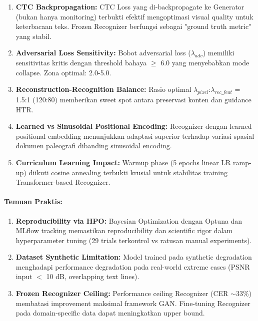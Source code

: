 \documentclass[12pt,a4paper]{article}
\begin{document}
\begin{enumerate}[label=\arabic*., leftmargin=0.5cm]
    \item \textbf{CTC Backpropagation:} CTC Loss yang di-backpropagate ke Generator (bukan hanya monitoring) terbukti efektif mengoptimasi visual quality untuk keterbacaan teks. Frozen Recognizer berfungsi sebagai "ground truth metric" yang stabil.
    
    \item \textbf{Adversarial Loss Sensitivity:} Bobot adversarial loss ($\lambda_{adv}$) memiliki sensitivitas kritis dengan threshold bahaya $\geq$ 6.0 yang menyebabkan mode collapse. Zona optimal: 2.0-5.0.
    
    \item \textbf{Reconstruction-Recognition Balance:} Rasio optimal $\lambda_{pixel}$:$\lambda_{rec\_feat}$ = 1.5:1 (120:80) memberikan sweet spot antara preservasi konten dan guidance HTR.
    
    \item \textbf{Learned vs Sinusoidal Positional Encoding:} Recognizer dengan learned positional embedding menunjukkan adaptasi superior terhadap variasi spasial dokumen paleografi dibanding sinusoidal encoding.
    
    \item \textbf{Curriculum Learning Impact:} Warmup phase (5 epochs linear LR ramp-up) diikuti cosine annealing terbukti krusial untuk stabilitas training Transformer-based Recognizer.
\end{enumerate}

\paragraph{Temuan Praktis:}

\begin{enumerate}[label=\arabic*., leftmargin=0.5cm]
    \item \textbf{Reproducibility via HPO:} Bayesian Optimization dengan Optuna dan MLflow tracking memastikan reproducibility dan scientific rigor dalam hyperparameter tuning (29 trials terkontrol vs ratusan manual experiments).
    
    \item \textbf{Dataset Synthetic Limitation:} Model trained pada synthetic degradation menghadapi performance degradation pada real-world extreme cases (PSNR input $<$ 10 dB, overlapping text lines).
    
    \item \textbf{Frozen Recognizer Ceiling:} Performance ceiling Recognizer (CER $\sim$33\%) membatasi improvement maksimal framework GAN. Fine-tuning Recognizer pada domain-specific data dapat meningkatkan upper bound.
\end{enumerate}
\end{document}
